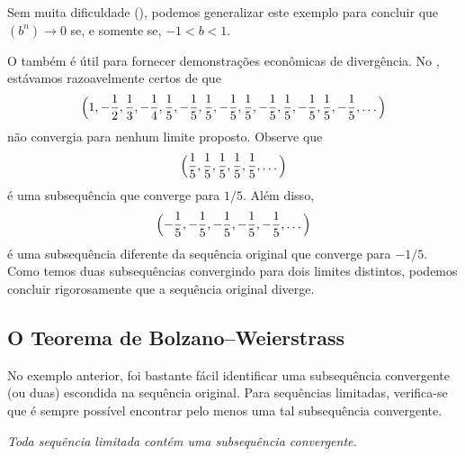 Sem muita dificuldade (), podemos generalizar este exemplo para concluir que $(b^n) \to 0$ se, e somente se, $-1 < b < 1$.

\begin{example}\label{exmpl:2-5-4}
O  também é útil para fornecer demonstrações econômicas de divergência. No , estávamos razoavelmente certos de que
\[
\Bigl( 1, -\frac12, \frac13, -\frac14, \frac15, -\frac15, \frac15, -\frac15, \frac15, -\frac15, \frac15, -\frac15, \frac15, -\frac15, \dots \Bigr)
\]
não convergia para nenhum limite proposto. Observe que
\[
\Bigl( \frac15, \frac15, \frac15, \frac15, \frac15, \dots \Bigr)
\]
é uma subsequência que converge para $1/5$. Além disso,
\[
\Bigl( -\frac15, -\frac15, -\frac15, -\frac15, -\frac15, \dots \Bigr)
\]
é uma subsequência diferente da sequência original que converge para $-1/5$. Como temos duas subsequências convergindo para dois limites distintos, podemos concluir rigorosamente que a sequência original diverge.
\end{example}

\subsection{O Teorema de Bolzano--Weierstrass}

No exemplo anterior, foi bastante fácil identificar uma subsequência convergente (ou duas) escondida na sequência original. Para sequências limitadas, verifica-se que é sempre possível encontrar pelo menos uma tal subsequência convergente.

\begin{theorem}\label{thm:bolzano-weierstrass}
\textit{Toda sequência limitada contém uma subsequência convergente.}
\end{theorem}

